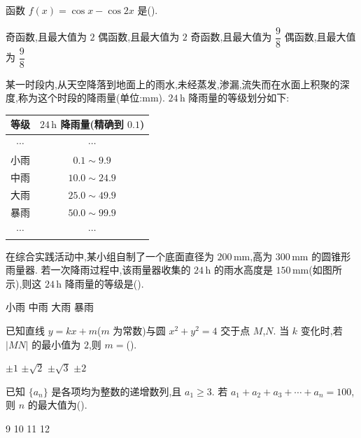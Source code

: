 \begin{problem}
函数 \(f(x)=\cos x-\cos2x\) 是(\quad).

\choices
    {奇函数,且最大值为 \(2\)}
    {偶函数,且最大值为 \(2\)}
    {奇函数,且最大值为 \(\dfrac{9}{8}\)}
    {偶函数,且最大值为 \(\dfrac{9}{8}\)}
\end{problem}

\begin{problem}
某一时段内,从天空降落到地面上的雨水,未经蒸发,渗漏,流失而在水面上积聚的深度,称为这个时段的降雨量(单位:\(\mathrm{mm}\)). \(24\,\mathrm{h}\) 降雨量的等级划分如下:

\begin{center}
\begin{tabular}{c|c}
等级 & \(24\,\mathrm{h}\) 降雨量(精确到 \(0.1\)) \\
\hline
\(\cdots\) & \(\cdots\) \\
小雨 & \(0.1\sim9.9\) \\
中雨 & \(10.0\sim24.9\) \\
大雨 & \(25.0\sim49.9\) \\
暴雨 & \(50.0\sim99.9\) \\
\(\cdots\) & \(\cdots\)
\end{tabular}
\end{center}

在综合实践活动中,某小组自制了一个底面直径为 \(200\,\mathrm{mm}\),高为 \(300\,\mathrm{mm}\) 的圆锥形雨量器. 若一次降雨过程中,该雨量器收集的 \(24\,\mathrm{h}\) 的雨水高度是 \(150\,\mathrm{mm}\)(如图所示),则这 \(24\,\mathrm{h}\) 降雨量的等级是(\quad).

\begin{center}
\end{center}

\choices
    {小雨}
    {中雨}
    {大雨}
    {暴雨}
\end{problem}

\begin{problem}
已知直线 \(y=kx+m\)(\(m\) 为常数)与圆 \(x^2+y^2=4\) 交于点 \(M\),\(N\). 当 \(k\) 变化时,若 \(|MN|\) 的最小值为 \(2\),则 \(m=\)(\quad).

\choices
    {\(\pm1\)}
    {\(\pm\sqrt2\)}
    {\(\pm\sqrt3\)}
    {\(\pm2\)}
\end{problem}

\begin{problem}
已知 \(\{a_n\}\) 是各项均为整数的递增数列,且 \(a_1\ge3\). 若 \(a_1+a_2+a_3+\cdots+a_n=100\),则 \(n\) 的最大值为(\quad).

\choices
    {9}
    {10}
    {11}
    {12}
\end{problem}

